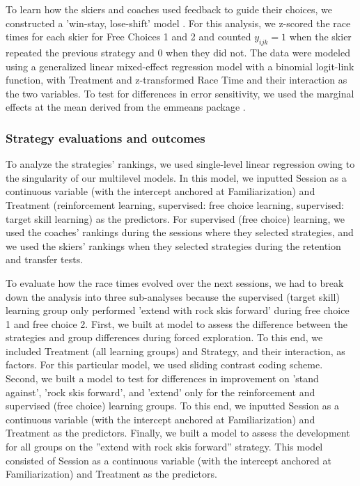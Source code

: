 \documentclass[pdflatex,sn-nature]{sn-jnl}%
\theoremstyle{thmstyleone}%
\theoremstyle{thmstyletwo}%
\theoremstyle{thmstylethree}%
\begin{document}
To learn how the skiers and coaches used feedback to guide their choices, we constructed a 'win-stay, lose-shift' model \cite{nowak_strategy_1993, worthy_comparison_2014, iyer_probing_2020}. For this analysis, we z-scored the race times for each skier for Free Choices 1 and 2 and counted \(y_{ijk}=1\) when the skier repeated the previous strategy and 0 when they did not. The data were modeled using a generalized linear mixed-effect regression model with a binomial logit-link function, with Treatment and z-transformed Race Time and their interaction as the two variables. To test for differences in error sensitivity, we used the marginal effects at the mean derived from the emmeans package \cite{lenth_emmeans_2023}.


\subsubsection{Strategy evaluations and outcomes}
To analyze the strategies' rankings, we used single-level linear regression owing to the singularity of our multilevel models. In this model, we inputted Session as a continuous variable (with the intercept anchored at Familiarization) and Treatment (reinforcement learning, supervised: free choice learning, supervised: target skill learning) as the predictors. For supervised (free choice) learning, we used the coaches' rankings during the sessions where they selected strategies, and we used the skiers' rankings when they selected strategies during the retention and transfer tests.

To evaluate how the race times evolved over the next sessions, we had to break down the analysis into three sub-analyses because the supervised (target skill) learning group only performed ’extend with rock skis forward’ during free choice 1 and free choice 2. First, we built at model to assess the difference between the strategies and group differences during forced exploration. To this end, we included Treatment (all learning groups) and Strategy, and their interaction, as factors. For this particular model, we used sliding contrast coding scheme. Second, we built a model to test for differences in improvement on ’stand against’, ’rock skis forward’, and ’extend’ only for the reinforcement and supervised (free choice) learning groups. To this end, we inputted Session as a continuous variable (with the intercept anchored at Familiarization) and Treatment as the predictors. Finally, we built a model to assess the development for all groups on the ”extend with rock skis forward” strategy. This model consisted of Session as a continuous variable (with the intercept anchored at Familiarization) and Treatment as the predictors.
\end{document}
